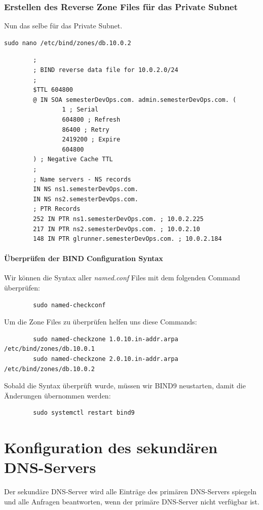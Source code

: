 \documentclass[a4paper,12pt]{article}
\begin{document}
\newpage

\subsubsection{Erstellen des Reverse Zone Files für das Private Subnet}
Nun das selbe für das Private Subnet.

\begin{verbatim}
sudo nano /etc/bind/zones/db.10.0.2
\end{verbatim}

\begin{verbatim}
		;
		; BIND reverse data file for 10.0.2.0/24
		;
		$TTL 604800
		@ IN SOA semesterDevOps.com. admin.semesterDevOps.com. (
				1 ; Serial 
				604800 ; Refresh
				86400 ; Retry
				2419200 ; Expire
				604800 
		) ; Negative Cache TTL
		;
		; Name servers - NS records
		IN NS ns1.semesterDevOps.com.
		IN NS ns2.semesterDevOps.com.
		; PTR Records
		252 IN PTR ns1.semesterDevOps.com. ; 10.0.2.225
		217 IN PTR ns2.semesterDevOps.com. ; 10.0.2.10
		148 IN PTR glrunner.semesterDevOps.com. ; 10.0.2.184
\end{verbatim}

\paragraph{Überprüfen der BIND Configuration Syntax}
Wir können die Syntax aller \textit{named.conf} Files mit dem folgenden Command überprüfen:

\begin{verbatim}
		sudo named-checkconf
\end{verbatim}
Um die Zone Files zu überprüfen helfen uns diese Commands:
\begin{verbatim}
		sudo named-checkzone 1.0.10.in-addr.arpa /etc/bind/zones/db.10.0.1
		sudo named-checkzone 2.0.10.in-addr.arpa /etc/bind/zones/db.10.0.2
\end{verbatim}
Sobald die Syntax überprüft wurde, müssen wir BIND9 neustarten, damit die Änderungen übernommen werden:
\begin{verbatim}
		sudo systemctl restart bind9
\end{verbatim}

\section{Konfiguration des sekundären DNS-Servers}  
Der sekundäre DNS-Server wird alle Einträge des primären DNS-Servers spiegeln 
und alle Anfragen beantworten, wenn der primäre DNS-Server nicht verfügbar ist.  
\end{document}

